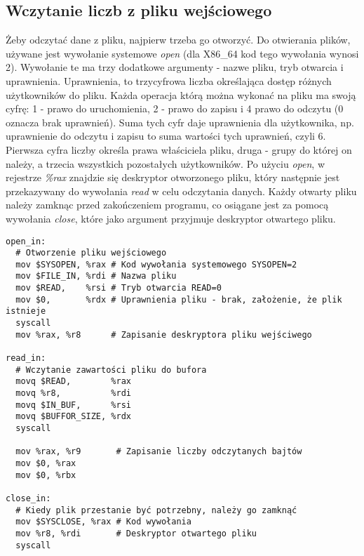 \documentclass[11pt]{report}
\begin{document}
\subsection{Wczytanie liczb z pliku wejściowego}
Żeby odczytać dane z pliku, najpierw trzeba go otworzyć. Do otwierania plików, używane jest wywołanie systemowe \textit{open} (dla X86\_64 kod tego wywołania wynosi 2). Wywołanie te ma trzy dodatkowe argumenty - nazwe pliku, tryb otwarcia i uprawnienia. Uprawnienia, to trzycyfrowa liczba określająca dostęp różnych użytkowników do pliku. Każda operacja którą można wykonać na pliku ma swoją cyfrę: 1 - prawo do uruchomienia, 2 - prawo do zapisu i 4 prawo do odczytu (0 oznacza brak uprawnień). Suma tych cyfr daje uprawnienia dla użytkownika, np. uprawnienie do odczytu i zapisu to suma wartości tych uprawnień, czyli 6. Pierwsza cyfra liczby określa prawa właściciela pliku, druga - grupy do której on należy, a trzecia wszystkich pozostałych użytkowników. Po użyciu \textit{open}, w rejestrze \textit{\%rax} znajdzie się deskryptor otworzonego pliku, który następnie jest przekazywany do wywołania \textit{read} w celu odczytania danych. Każdy otwarty pliku należy zamknąc przed zakończeniem programu, co osiągane jest za pomocą wywołania \textit{close}, które jako argument przyjmuje deskryptor otwartego pliku.
\begin{verbatim}
open_in:
  # Otworzenie pliku wejściowego
  mov $SYSOPEN, %rax # Kod wywołania systemowego SYSOPEN=2
  mov $FILE_IN, %rdi # Nazwa pliku
  mov $READ,    %rsi # Tryb otwarcia READ=0
  mov $0,       %rdx # Uprawnienia pliku - brak, założenie, że plik istnieje
  syscall
  mov %rax, %r8      # Zapisanie deskryptora pliku wejściwego

read_in:
  # Wczytanie zawartości pliku do bufora
  movq $READ,        %rax
  movq %r8,          %rdi
  movq $IN_BUF,      %rsi
  movq $BUFFOR_SIZE, %rdx
  syscall

  mov %rax, %r9		  # Zapisanie liczby odczytanych bajtów
  mov $0, %rax
  mov $0, %rbx
  
close_in:
  # Kiedy plik przestanie być potrzebny, należy go zamknąć
  mov $SYSCLOSE, %rax # Kod wywołania
  mov %r8, %rdi       # Deskryptor otwartego pliku
  syscall
\end{verbatim}
\newpage
\end{document}
